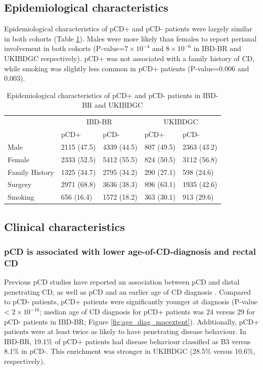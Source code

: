 \subsection{Epidemiological characteristics}
Epidemiological characteristics of pCD+ and pCD- patients were largely similar in both cohorts (Table \ref{table:epidem}). Males were more likely than females to report perianal involvement in both cohorts (P-value={$7\times10^{-4}$} and {$8\times10^{-6}$} in IBD-BR and UKIBDGC respectively). pCD+ was not associated with a family history of CD, while smoking was slightly less common in pCD+ patients (P-value=0.006 and 0.003).
\setlength{\tabcolsep}{10pt} 
\renewcommand{\arraystretch}{1.5}
\begin{table}[H]
  \caption{Epidemiological characteristics of pCD+ and pCD- patients in IBD-BR and UKIBDGC}
  \label{table:epidem}
  \centering
  \begin{tabular}[t]{lllll}
  \toprule
  \multicolumn{1}{c}{ } & \multicolumn{2}{c}{IBD-BR} & \multicolumn{2}{c}{UKIBDGC} \\
  \cmidrule(l{3pt}r{3pt}){2-3} \cmidrule(l{3pt}r{3pt}){4-5}
   & pCD+ & pCD- & pCD+ & pCD-\\
  \midrule
  Male & 2115 (47.5) & 4339 (44.5) & 807 (49.5) & 2363 (43.2)\\
  Female & 2333 (52.5) & 5412 (55.5) & 824 (50.5) & 3112 (56.8)\\
  Family History & 1325 (34.7) & 2795 (34.2) & 290 (27.1) & 598 (24.6)\\
  Surgery & 2971 (68.8) & 3636 (38.3) & 896 (63.1) & 1935 (42.6)\\
  Smoking & 656 (16.4) & 1572 (18.2) & 363 (30.1) & 913 (29.6)\\
  \bottomrule
  \end{tabular}
  \end{table}


  \subsection{Clinical characteristics}
\subsubsection{pCD is associated with lower age-of-CD-diagnosis and rectal CD}

Previous pCD studies have reported an association between pCD and distal penetrating CD, as well as pCD and an earlier age of CD diagnosis \cite{Duricova2014-gf,Kaur2016-bs}. Compared to pCD- patients, pCD+ patients were significantly younger at diagnosis (P-value < $2\times10^{-16}$; median age of CD diagnosis for pCD+ patients was 24 versus 29 for pCD- patients in IBD-BR; Figure \ref{fig:age_diag_macextent}). Additionally, pCD+ patients were at least twice as likely to have penetrating disease behaviour. In IBD-BR, 19.1\% of pCD+ patients had disease behaviour classified as B3 versus 8.1\% in pCD-. This enrichment was stronger in UKIBDGC (28.5\% versus 10.6\%, respectively). \\

